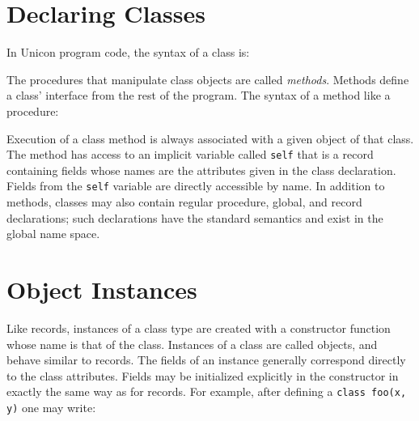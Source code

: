 \section{Declaring Classes}

In Unicon program code, the syntax of a class
is: 


\noindent
The procedures that manipulate class objects are called
\textit{methods}. Methods define a
class' interface from the rest of the program. The
syntax of a method like a procedure: 


Execution of a class method is always associated with a given object of
that class. The method has access to an implicit
variable called
\texttt{self} that is a record containing fields whose
names are the attributes given in the class declaration. Fields from
the \texttt{self} variable are directly accessible by name. In addition
to methods, classes may also contain regular procedure, global, and
record declarations; such declarations have the standard semantics and
exist in the global name space. 

\section{Object Instances}

Like records, instances of a class type
are created with a constructor function whose
name is that of the class. Instances of a class are called objects, and
behave similar to records. The fields of an instance generally
correspond directly to the class attributes. Fields may be initialized
explicitly in the constructor in exactly the same way as for records.
For example, after defining a \texttt{class foo(x, y)} one may write: 


